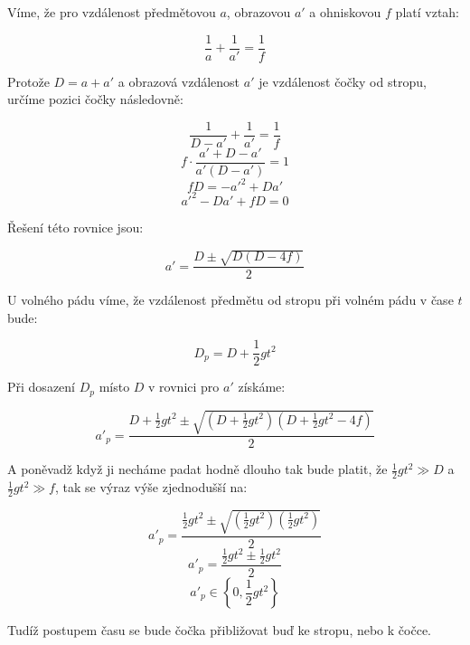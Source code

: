 \documentclass{fkssolpub}
\author{Ondřej Sedláček}
\begin{document}
Víme, že pro vzdálenost předmětovou $a$, obrazovou $a'$ a ohniskovou $f$ platí vztah:

\[
	\frac{1}{a} + \frac{1}{a'} = \frac{1}{f}
\]

Protože $D = a + a'$ a obrazová vzdálenost $a'$ je vzdálenost čočky od stropu, určíme pozici čočky následovně:

\[
	\frac{1}{D - a'} + \frac{1}{a'} = \frac{1}{f}
\]
\[
	f \cdot \frac{a' + D - a'}{a' (D - a')} = 1
\]
\[
	fD = - a'^2 + Da'
\]
\[
	a'^2 - Da' + fD = 0
\]

Řešení této rovnice jsou:

\[
	a' = \frac{D \pm \sqrt{D (D - 4f)}}{2}
\]

U volného pádu víme, že vzdálenost předmětu od stropu při volném pádu v čase $t$ bude:

\[
	D_p = D + \frac{1}{2} g t^2
\]

Při dosazení $D_p$ místo $D$ v rovnici pro $a'$ získáme:

\[
	a'_p = \frac{D + \frac{1}{2} gt^2 \pm \sqrt{\left(D + \frac{1}{2} g t^2\right) \left( D + \frac{1}{2} g t^2  - 4f\right)}}{2}
\]

A poněvadž když ji necháme padat hodně dlouho tak bude platit, že $\frac{1}{2} g t^2 \gg D$ a $\frac{1}{2} g t^2 \gg f$, tak se výraz výše zjednodušší na:

\[
	a'_p = \frac{\frac{1}{2} gt^2 \pm \sqrt{\left(\frac{1}{2} g t^2\right) \left(\frac{1}{2} g t^2\right)}}{2}
\]
\[
	a'_p = \frac{\frac{1}{2} gt^2 \pm \frac{1}{2} g t^2}{2}
\]
\[
	a'_p \in \left\{0, \frac{1}{2} g t^2\right\}
\]

Tudíž postupem času se bude čočka přibližovat buď ke stropu, nebo k čočce.
\end{document}
